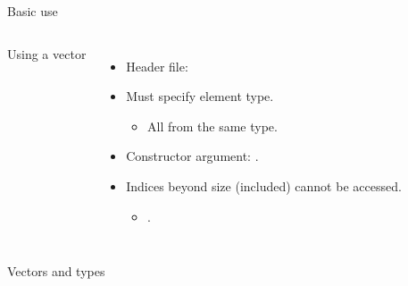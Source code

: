 \begin{frame}{Basic use}
\vspace{-1.5em}
\begin{columns}[t]

\begin{block}{Using a vector}

\end{block}

\begin{itemize}
  \item Header file:

  \item Must specify element type.
    \begin{itemize}
      \item All from the same type.
    \end{itemize}

  \item Constructor argument:
      .

  \item Indices beyond size (included) cannot be accessed.
    \begin{itemize}
      \item {}.
    \end{itemize}
\end{itemize}
\end{columns}
\end{frame}

\begin{frame}
\begin{block}{Vectors and types}

\end{block}
\end{frame}

